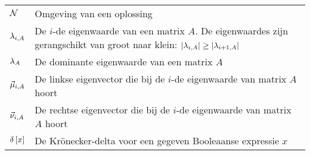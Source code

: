 \begin{flushleft}
\begin{tabularx}{\textwidth}{@{}p{22mm}X@{}}
    $\neighbr$					& Omgeving van een oplossing\\
    $\ev[i,A]$					& De $i$-de eigenwaarde van een matrix $A$. De eigenwaardes zijn gerangschikt van groot naar klein: $\abs{\ev[i,A]}\geq\abs{\ev[i+1,A]}$\\
    $\ev[A]$					& De dominante eigenwaarde van een matrix $A$\\
    $\evl[i,A]$					& De linkse eigenvector die bij de $i$-de eigenwaarde van matrix $A$ hoort\\
    $\evr[i,A]$					& De rechtse eigenvector die bij de $i$-de eigenwaarde van matrix $A$ hoort\\
    $\krdelta{x}$				& De Kr\"onecker-delta voor een gegeven Booleaanse expressie $x$\\
  \end{tabularx}
\end{flushleft}